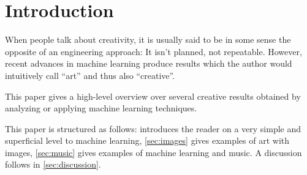 
\section{Introduction}
\label{sec:introduction}
When people talk about creativity, it is usually said to be in some sense the
opposite of an engineering approach: It isn't planned, not repeatable. However,
recent advances in machine learning produce results which the author would
intuitively call \enquote{art} and thus also \enquote{creative}.

This paper gives a high-level overview over several creative results obtained
by analyzing or applying machine learning techniques.

This paper is structured as follows:  introduces the
reader on a very simple and superficial level to machine learning,
\cref{sec:images} gives examples of art with images, \cref{sec:music} gives
examples of machine learning and music. A discussion follows in
\cref{sec:discussion}.
